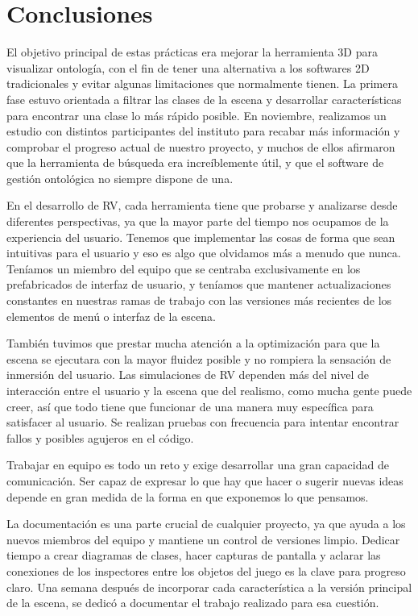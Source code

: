 \chapter*{Conclusiones}

El objetivo principal de estas prácticas era mejorar la herramienta 3D para visualizar ontología, con el fin de tener una alternativa a los softwares 2D tradicionales y evitar algunas limitaciones que normalmente tienen.
La primera fase estuvo orientada a filtrar las clases de la escena y desarrollar características para encontrar una clase lo más rápido posible. En noviembre, realizamos un estudio con distintos participantes del instituto
para recabar más información y comprobar el progreso actual de nuestro proyecto, y muchos de ellos afirmaron que la herramienta de búsqueda era increíblemente útil, y que el software de gestión ontológica no siempre dispone de una.

En el desarrollo de RV, cada herramienta tiene que probarse y analizarse desde diferentes perspectivas, ya que la mayor parte del tiempo nos ocupamos de la experiencia del usuario. Tenemos que implementar las cosas de forma que sean intuitivas para el usuario
y eso es algo que olvidamos más a menudo que nunca. Teníamos un miembro del equipo que se centraba exclusivamente en los prefabricados de interfaz de usuario, y teníamos que mantener actualizaciones constantes en nuestras ramas de trabajo con las versiones más recientes de los elementos de menú o interfaz de la escena.

También tuvimos que prestar mucha atención a la optimización para que la escena se ejecutara con la mayor fluidez posible y no rompiera la sensación de inmersión del usuario. Las simulaciones de RV dependen más del nivel de interacción entre el usuario y la escena que del realismo,
como mucha gente puede creer, así que todo tiene que funcionar de una manera muy específica para satisfacer al usuario. Se realizan pruebas con frecuencia para intentar encontrar fallos y posibles agujeros en el código.

Trabajar en equipo es todo un reto y exige desarrollar una gran capacidad de comunicación. Ser capaz de expresar lo que hay que hacer o sugerir nuevas ideas depende en gran medida de la forma en que exponemos lo que pensamos.

La documentación es una parte crucial de cualquier proyecto, ya que ayuda a los nuevos miembros del equipo y mantiene un control de versiones limpio. Dedicar tiempo a crear diagramas de clases, hacer capturas de pantalla y aclarar las conexiones de los inspectores entre los objetos del juego es la clave para
progreso claro. Una semana después de incorporar cada característica a la versión principal de la escena, se dedicó a documentar el trabajo realizado para esa cuestión.


